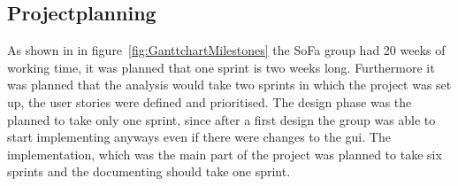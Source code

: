 \subsection{Projectplanning}

As shown in in figure~\ref{fig:GanttchartMilestones} the SoFa group had 20 weeks of working time, it was planned that one sprint is two weeks long. Furthermore it was planned that the analysis would take two sprints in which the project was set up, the user stories were defined and prioritised. The design phase was the planned to take only one sprint, since after a first design the group was able to start implementing anyways even if there were changes to the \gls{gui}.
The implementation, which was the main part of the project was planned to take six sprints and the documenting should take one sprint.
